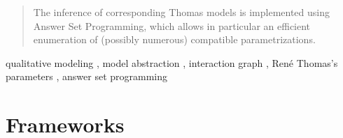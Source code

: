 \documentclass[preprint]{elsarticle}
\def\modMF#1{\textcolor{teal}{#1}}
\def\modLP#1{\textcolor{magenta}{#1}}
\def\modMM#1{\textcolor{blue}{#1}}
\def\modOR#1{\textcolor{olive}{#1}}
\def\modMF#1{#1} \def\modLP#1{#1} \def\modMM#1{#1} \def\modOR#1{#1}
\begin{document}
\begin{frontmatter}
\begin{abstract}
The inference of corresponding Thomas models is \modLP{implemented} using Answer Set Programming,
which allows \modMF{in particular} an efficient enumeration of (possibly numerous) compatible parametrizations.
\end{abstract}

\begin{keyword}
qualitative modeling \sep
model abstraction \sep
interaction graph \sep
René Thomas's parameters \sep
answer set programming
\end{keyword}

\end{frontmatter}




\section{Frameworks}\label{sec:frameworks}













\appendix

\end{document}
